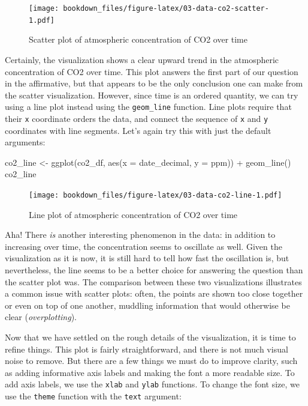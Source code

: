 \documentclass[
]{krantz}
\makeatletter
\newenvironment{Shaded}{\begin{snugshade}}{\end{snugshade}}
\newcommand{\AttributeTok}[1]{\textcolor[rgb]{0.61,0.61,0.61}{#1}}
\newcommand{\FunctionTok}[1]{\textcolor[rgb]{0,0,0}{#1}}
\newcommand{\NormalTok}[1]{#1}
\newcommand{\OtherTok}[1]{\textcolor[rgb]{0.37,0.37,0.37}{#1}}
\newcommand{\SpecialCharTok}[1]{\textcolor[rgb]{0,0,0}{#1}}
\newenvironment{kframe}{%
\medskip{}
\setlength{\fboxsep}{.8em}
 \def\at@end@of@kframe{}%
 \ifinner\ifhmode%
  \def\at@end@of@kframe{\end{minipage}}%
  \begin{minipage}{\columnwidth}%
 \fi\fi%
 \def\FrameCommand##1{\hskip\@totalleftmargin \hskip-\fboxsep
 \colorbox{shadecolor}{##1}\hskip-\fboxsep
     \hskip-\linewidth \hskip-\@totalleftmargin \hskip\columnwidth}%
 \MakeFramed {\advance\hsize-\width
   \@totalleftmargin\z@ \linewidth\hsize
   \@setminipage}}%
 {\par\unskip\endMakeFramed%
 \at@end@of@kframe}
\renewenvironment{Shaded}{\begin{kframe}}{\end{kframe}}
\makeatother
\begin{document}
\begin{figure}
\centering
\texttt{[image: bookdown\_files/figure-latex/03-data-co2-scatter-1.pdf]}
\caption{\label{fig:03-data-co2-scatter}Scatter plot of atmospheric concentration of CO2 over time}
\end{figure}

Certainly, the visualization shows a clear upward trend in the atmospheric concentration of CO2 over time.
This plot answers the first part of our question in the affirmative, but that appears to be the only conclusion one can make from the scatter visualization.
However, since time is an ordered quantity, we can try using a line plot instead using the \texttt{geom\_line} function. Line plots require
that their \texttt{x} coordinate orders the data, and connect the sequence of \texttt{x} and \texttt{y} coordinates with line segments. Let's again try this with just
the default arguments:

\begin{Shaded}
\begin{Highlighting}[]
\NormalTok{co2\_line }\OtherTok{\textless{}{-}} \FunctionTok{ggplot}\NormalTok{(co2\_df, }\FunctionTok{aes}\NormalTok{(}\AttributeTok{x =}\NormalTok{ date\_decimal, }\AttributeTok{y =}\NormalTok{ ppm)) }\SpecialCharTok{+}
  \FunctionTok{geom\_line}\NormalTok{()}
\NormalTok{co2\_line}
\end{Highlighting}
\end{Shaded}

\begin{figure}
\centering
\texttt{[image: bookdown\_files/figure-latex/03-data-co2-line-1.pdf]}
\caption{\label{fig:03-data-co2-line}Line plot of atmospheric concentration of CO2 over time}
\end{figure}

Aha! There \emph{is} another interesting phenomenon in the data: in addition to increasing over time, the concentration seems to oscillate as well.
Given the visualization as it is now, it is still hard to tell how fast the oscillation is, but nevertheless, the line seems to
be a better choice for answering the question than the scatter plot was. The comparison between these two visualizations illustrates a common issue with
scatter plots: often, the points are shown too close together or even on top of one another, muddling information that would otherwise be clear (\emph{overplotting}).

Now that we have settled on the rough details of the visualization, it is time to refine things. This plot is fairly straightforward, and there is not much
visual noise to remove. But there are a few things we must do to improve clarity, such as adding informative axis labels and making the font a more readable size.
To add axis labels, we use the \texttt{xlab} and \texttt{ylab} functions. To change the font size, we use the \texttt{theme} function with the \texttt{text} argument:
\end{document}
